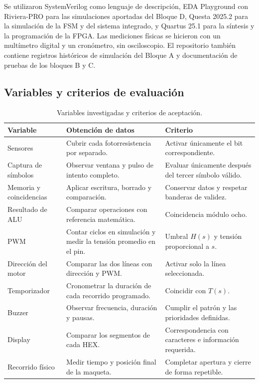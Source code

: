 \documentclass[12pt,letterpaper]{article}
\begin{document}
Se utilizaron SystemVerilog como lenguaje de descripción,
EDA Playground con Riviera-PRO para las simulaciones
aportadas del Bloque D, Questa 2025.2 para la simulación
de la FSM y del sistema integrado, y Quartus 25.1 para la
síntesis y la programación de la FPGA. Las mediciones
físicas se hicieron con un multímetro digital y un
cronómetro, sin osciloscopio. El repositorio también
contiene registros históricos de simulación del Bloque A
y documentación de pruebas de los bloques B y C.

\subsection{Variables y criterios de evaluación}

\begin{table}[H]
\centering
\small
\begin{tabularx}{\textwidth}{@{}p{3cm}YY@{}}
\toprule
Variable & Obtención de datos & Criterio\\
\midrule
Sensores &
Cubrir cada fotorresistencia por separado. &
Activar únicamente el bit correspondiente.\\
Captura de símbolos &
Observar ventana y pulso de intento completo. &
Evaluar únicamente después del tercer símbolo válido.\\
Memoria y coincidencias &
Aplicar escritura, borrado y comparación. &
Conservar datos y respetar banderas de validez.\\
Resultado de ALU &
Comparar operaciones con referencia matemática. &
Coincidencia módulo ocho.\\
PWM &
Contar ciclos en simulación y medir la tensión
promedio en el pin. &
Umbral $H(s)$ y tensión proporcional a $s$.\\
Dirección del motor &
Comparar las dos líneas con dirección y PWM. &
Activar solo la línea seleccionada.\\
Temporizador &
Cronometrar la duración de cada recorrido programado. &
Coincidir con $T(s)$.\\
Buzzer &
Observar frecuencia, duración y pausas. &
Cumplir el patrón y las prioridades definidas.\\
Display &
Comparar los segmentos de cada HEX. &
Correspondencia con caracteres e información requerida.\\
Recorrido físico &
Medir tiempo y posición final de la maqueta. &
Completar apertura y cierre de forma repetible.\\
\bottomrule
\end{tabularx}
\caption{Variables investigadas y criterios de aceptación.}
\end{table}
\end{document}
